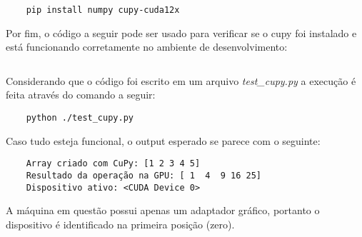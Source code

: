 \documentclass[12pt,a4paper]{article}
\begin{document}
\begin{verbatim}
    pip install numpy cupy-cuda12x
\end{verbatim}

Por fim, o código a seguir pode ser usado para verificar se o cupy foi instalado e está funcionando corretamente no ambiente de desenvolvimento:

\inputminted{python}{cfd_on_gpu/teste_cupy.py}

Considerando que o código foi escrito em um arquivo \emph{test\_cupy.py} a execução é feita através do comando a seguir:

\begin{verbatim}
    python ./test_cupy.py
\end{verbatim}

Caso tudo esteja funcional, o output esperado se parece com o seguinte:

\begin{verbatim}
    Array criado com CuPy: [1 2 3 4 5]
    Resultado da operação na GPU: [ 1  4  9 16 25]
    Dispositivo ativo: <CUDA Device 0>
\end{verbatim}

A máquina em questão possui apenas um adaptador gráfico, portanto o dispositivo é identificado na primeira posição (zero).
\end{document}
